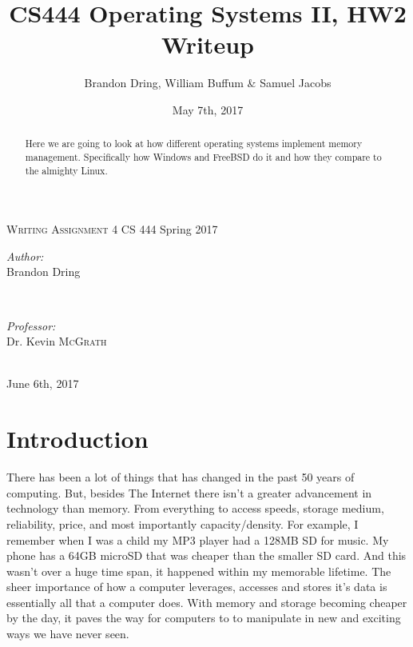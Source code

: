 \documentclass{article}
\title{CS444 Operating Systems II, HW2 Writeup}
\author{Brandon Dring, William Buffum \& Samuel Jacobs}
\date{May 7th, 2017}
\begin{document}
\begin{titlepage}

\center

\textsc{\LARGE \hspace{15mm} Writing Assignment 4} \newline \newline
{\large CS 444 Spring 2017}



\begin{minipage}{0.4\textwidth}
   \begin{flushleft} \large
      \emph{Author:}\\
      Brandon Dring \\
   \end{flushleft}
\end{minipage}
~
\begin{minipage}{0.4\textwidth}
   \begin{flushright} \large
      \emph{Professor:} \\
      Dr. Kevin \textsc{McGrath} %
   \end{flushright}
\end{minipage} \\ [4cm]

{\large June 6th, 2017}
\vfill %

\begin{abstract}
    Here we are going to look at how different operating systems implement memory management. Specifically how Windows and FreeBSD do it and how they compare to the almighty Linux.
\end{abstract}

\pagebreak

\end{titlepage}
\newpage
\section{Introduction}
	There has been a lot of things that has changed in the past 50 years of computing. But, besides The Internet there isn’t a greater advancement in technology than memory. From everything to access speeds, storage medium, reliability, price, and most importantly capacity/density. For example, I remember when I was a child my MP3 player had a 128MB SD for music. My phone has a 64GB microSD that was cheaper than the smaller SD card. And this wasn’t over a huge time span, it happened within my memorable lifetime. The sheer importance of how a computer leverages, accesses and stores it’s data is essentially all that a computer does. With memory and storage becoming cheaper by the day, it paves the way for computers to to manipulate in new and exciting ways we have never seen.
\end{document}
